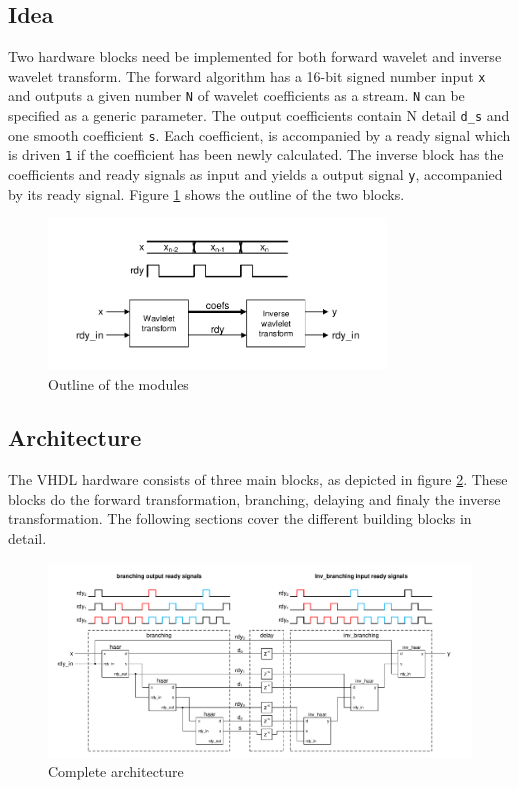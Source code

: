 \begin{refsection}
\subsection{Idea}

Two hardware blocks need be implemented for both forward wavelet and inverse wavelet transform.
The forward algorithm has a 16-bit signed number input \texttt{x} and outputs a given number \texttt{N} of wavelet coefficients as a stream.
\texttt{N} can be specified as a generic parameter.
The output coefficients contain N detail \texttt{d\_s} and one smooth coefficient \texttt{s}.
Each coefficient, is accompanied by a ready signal which is driven \texttt{1} if the coefficient has been newly calculated.
The inverse block has the coefficients and ready signals as input and yields a output signal \texttt{y}, accompanied by its ready signal.
Figure \ref{fpga:fig:idea} shows the outline of the two blocks.
\begin{figure}
	\centering
	\includegraphics[width=0.8\textwidth]{papers/fpga/images/idea.pdf}
	\caption{Outline of the modules \label{fpga:fig:idea}}
\end{figure}


\subsection{Architecture}
The VHDL hardware consists of three main blocks, as depicted in figure \ref{fpga:fig:architecture}.
These blocks do the forward transformation, branching, delaying and finaly the inverse transformation.
The following sections cover the different building blocks in detail. 
\begin{figure}
	\centering
	\includegraphics[width=\textwidth]{papers/fpga/images/main_delay.pdf}
	\caption{Complete architecture \label{fpga:fig:architecture}}
\end{figure}

\end{refsection}
